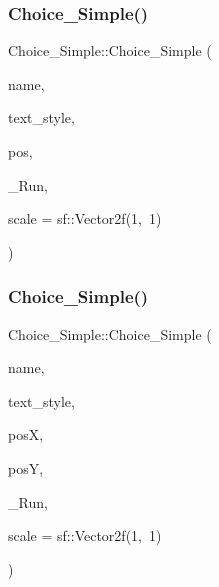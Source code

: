 \subsubsection{\texorpdfstring{Choice\+\_\+\+Simple()}{Choice\_Simple()}\hspace{0.1cm}{\footnotesize\ttfamily [1/2]}}
{\footnotesize\ttfamily Choice\+\_\+\+Simple\+::\+Choice\+\_\+\+Simple (\begin{DoxyParamCaption}\item[{const char $\ast$}]{name,  }\item[{const sf\+::\+Text \&}]{text\+\_\+style,  }\item[{sf\+::\+Vector2f}]{pos,  }\item[{std\+::function$<$ \hyperlink{_globals_8h_a3d5776bab98402b03be09156bacf4f68}{Screens}(const sf\+::\+Render\+Target \&, \hyperlink{class_game__window}{Game\+\_\+window} \&)$>$}]{\+\_\+\+Run,  }\item[{sf\+::\+Vector2f}]{scale = {\ttfamily sf\+:\+:Vector2f(1,~1)} }\end{DoxyParamCaption})}

\mbox{\label{class_choice___simple_a1d189a21d6decdf65cfa88cf90b4cdf2}} 
\subsubsection{\texorpdfstring{Choice\+\_\+\+Simple()}{Choice\_Simple()}\hspace{0.1cm}{\footnotesize\ttfamily [2/2]}}
{\footnotesize\ttfamily Choice\+\_\+\+Simple\+::\+Choice\+\_\+\+Simple (\begin{DoxyParamCaption}\item[{const char $\ast$}]{name,  }\item[{const sf\+::\+Text \&}]{text\+\_\+style,  }\item[{float}]{posX,  }\item[{float}]{posY,  }\item[{std\+::function$<$ \hyperlink{_globals_8h_a3d5776bab98402b03be09156bacf4f68}{Screens}(const sf\+::\+Render\+Target \&, \hyperlink{class_game__window}{Game\+\_\+window} \&)$>$}]{\+\_\+\+Run,  }\item[{sf\+::\+Vector2f}]{scale = {\ttfamily sf\+:\+:Vector2f(1,~1)} }\end{DoxyParamCaption})}

